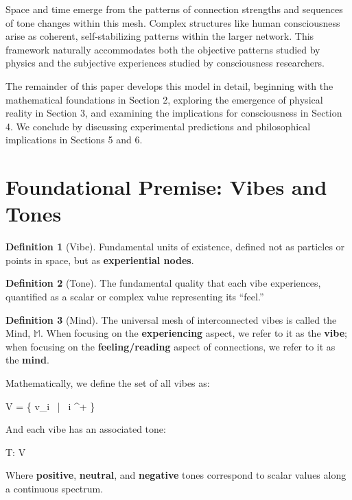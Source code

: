 \documentclass{article}
\let\oldequation\equation
\let\endoldequation\endequation
\renewenvironment{equation}{%
    \noindent\vspace{-\parskip}\vspace{-\baselineskip}%
    \oldequation
}{%
    \endoldequation
    \noindent\vspace{-\parskip}\vspace{-\baselineskip}%
}
\theoremstyle{definition}
\theoremstyle{axiom}
\theoremstyle{theorem}
\theoremstyle{proposition}
\newtheorem{definition}{Definition}      %
\begin{document}
Space and time emerge from the patterns of connection strengths and sequences of tone changes within this mesh. Complex structures like human consciousness arise as coherent, self-stabilizing patterns within the larger network. This framework naturally accommodates both the objective patterns studied by physics and the subjective experiences studied by consciousness researchers.

The remainder of this paper develops this model in detail, beginning with the mathematical foundations in Section 2, exploring the emergence of physical reality in Section 3, and examining the implications for consciousness in Section 4. We conclude by discussing experimental predictions and philosophical implications in Sections 5 and 6.

\section{Foundational Premise: Vibes and Tones}
\begin{definition}[Vibe]
Fundamental units of existence, defined not as particles or points in space, but as \textbf{experiential nodes}.
\end{definition}

\begin{definition}[Tone]
The fundamental quality that each vibe experiences, quantified as a scalar or complex value representing its \enquote{feel.}
\end{definition}

\begin{definition}[Mind]
The universal mesh of interconnected vibes is called the Mind, $\mathbb{M}$. When focusing on the \textbf{experiencing} aspect, we refer to it as the \textbf{vibe}; when focusing on the \textbf{feeling/reading} aspect of connections, we refer to it as the \textbf{mind}.
\end{definition}

Mathematically, we define the set of all vibes as:

\begin{equation}
V = \{ v_i \ | \ i \in {}^+ \}
\end{equation}

And each vibe has an associated tone:

\begin{equation}
T: V \rightarrow {}
\end{equation}

Where \textbf{positive}, \textbf{neutral}, and \textbf{negative} tones correspond to scalar values along a continuous spectrum.
\end{document}
